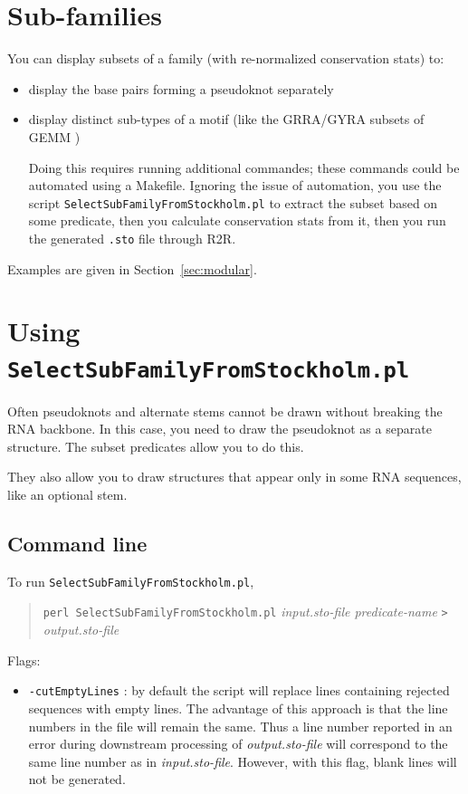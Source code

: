 \documentclass[letterpaper,12pt]{report}
\newcommand{\example}[1]{
\begin{quote}
{\raggedright
#1
}
\end{quote}
}
\begin{document}
\section{Sub-families}
You can display subsets of a family (with re-normalized conservation
stats) to:

\begin{itemize}
\item display the base pairs forming a pseudoknot separately
\item display distinct sub-types of a motif (like the GRRA/GYRA subsets
of GEMM \cite{Weinberg22Motifs,SudarsanGEMM})

Doing this requires running additional commandes; these commands could be automated using a Makefile.  Ignoring the issue
of automation, you use the script {\tt SelectSubFamilyFromStockholm.pl} to
extract the subset based on some predicate, then you calculate
conservation stats from it, then you run the generated {\tt .sto} file
through R2R.
\end{itemize}

Examples are given in Section~\ref{sec:modular}.

\section{Using
{\tt SelectSubFamilyFromStockholm.pl}}
Often pseudoknots and alternate stems cannot be drawn without breaking
the RNA backbone. In this case, you need to draw the pseudoknot as a
separate structure. The subset predicates allow you to do this.

They also allow you to draw structures that appear only in some RNA
sequences, like an optional stem.

\subsection{Command line}
To run  {\tt SelectSubFamilyFromStockholm.pl}, 

\example{{\tt perl SelectSubFamilyFromStockholm.pl} \textit{input.sto-file 
predicate-name}  {\tt {\textgreater}}  \textit{output.sto-file}}

Flags:
\begin{itemize}
\item {\tt -cutEmptyLines} : by default the script will replace lines containing rejected sequences with empty lines.  The advantage of this approach is that the line numbers in the file will remain the same.  Thus a line number reported in an error during downstream processing of {\it output.sto-file} will correspond to the same line number as in {\it input.sto-file}.  However, with this flag, blank lines will not be generated.
\end{itemize}
\end{document}
